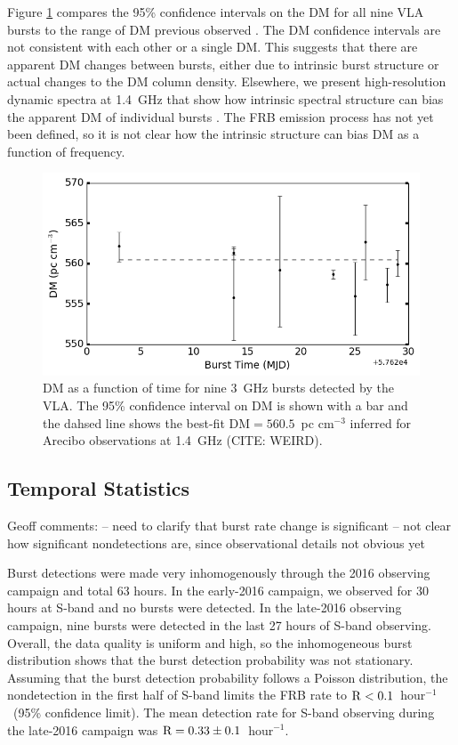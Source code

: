 \documentclass[twocolumn]{aastex61}
\begin{document}
Figure \ref{fig:dmmodel} compares the 95\% confidence intervals on the DM for all nine VLA bursts to the range of DM previous observed \citep{2014ApJ...790..101S,2016arXiv160308880S}. The DM confidence intervals are not consistent with each other or a single DM. This suggests that there are apparent DM changes between bursts, either due to intrinsic burst structure or actual changes to the DM column density. Elsewhere, we present high-resolution dynamic spectra at 1.4~GHz that show how intrinsic spectral structure can bias the apparent DM of individual bursts \citep{WEIRD}. The FRB emission process has not yet been defined, so it is not clear how the intrinsic structure can bias DM as a function of frequency.

\begin{figure}[htb]
\begin{center}
\includegraphics[width=0.9\columnwidth]{dmmodel}
\caption{DM as a function of time for nine 3~GHz bursts detected by the VLA. The 95\% confidence interval on DM is shown with a bar and the dahsed line shows the best-fit DM$=560.5$\ pc cm$^{-3}$ inferred for Arecibo observations at 1.4~GHz (CITE: WEIRD).
\label{fig:dmmodel}}
\end{center}
\end{figure}


\subsection{Temporal Statistics}
\label{sec:temp}
Geoff comments:
-- need to clarify that burst rate change is significant
-- not clear how significant nondetections are, since observational details not obvious yet

Burst detections were made very inhomogenously through the 2016 observing campaign and total 63 hours. In the early-2016 campaign, we observed for 30 hours at S-band and no bursts were detected. In the late-2016 observing campaign, nine bursts were detected in the last 27 hours of S-band observing. Overall, the data quality is uniform and high, so the inhomogeneous burst distribution shows that the burst detection probability was not stationary. Assuming that the burst detection probability follows a Poisson distribution, the nondetection in the first half of S-band limits the FRB rate to $\rm{R}<0.1$\ hour$^{-1}$\ (95\% confidence limit). The mean detection rate for S-band observing during the late-2016 campaign was $\rm{R}=0.33\pm0.1$\ hour$^{-1}$.
\end{document}
